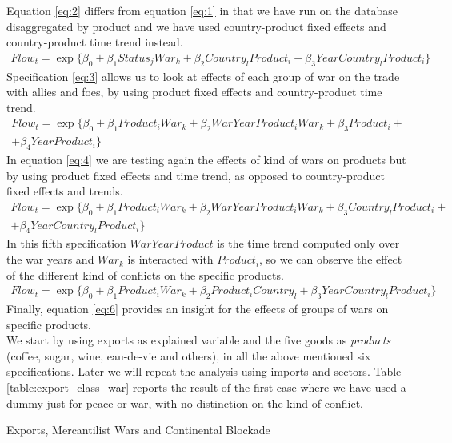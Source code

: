 \documentclass[12pt,a4paper,notitlepage,english]{article}
\begin{document}
Equation \ref{eq:2} differs from equation \ref{eq:1} in that we have run on the database disaggregated by product and we have used country-product fixed effects and country-product time trend instead.  
\begin{multline}\label{eq:3}
Flow_{t}=\exp\{\beta_0+\beta_1Status_jWar_k + \beta_2Country_lProduct_i+\beta_3YearCountry_lProduct_i\}
\end{multline}
Specification \ref{eq:3} allows us to look at effects of each group of war on the trade with allies and foes, by using product fixed effects and country-product time trend.
\begin{multline}\label{eq:4}
Flow_{t}=\exp\{\beta_0+\beta_1Product_iWar_k + \beta_2WarYearProduct_iWar_k+\beta_3Product_i +\\ +\beta_4YearProduct_i\}
\end{multline}
In equation \ref{eq:4} we are testing again the effects of kind of wars on products but by using product fixed effects and time trend, as opposed to country-product fixed effects and trends. 
\begin{multline}\label{eq:5}
Flow_{t}=\exp\{\beta_0+\beta_1Product_iWar_k + \beta_2WarYearProduct_iWar_k+\beta_3Country_lProduct_i +\\ +\beta_4YearCountry_lProduct_i\}
\end{multline}
In this fifth specification $WarYearProduct$ is the time trend computed only over the war years and $War_k$ is interacted with $Product_i$, so we can observe the effect of the different kind of conflicts on the specific products. 
\begin{multline}\label{eq:6}
Flow_{t}=\exp\{\beta_0+\beta_1Product_iWar_k + \beta_2Product_iCountry_l+\beta_3YearCountry_lProduct_i\}
\end{multline}
Finally, equation \ref{eq:6} provides an insight for the effects of groups of wars on specific products. \\
We start by using exports as explained variable and the five goods as \textit{products} (coffee, sugar, wine, eau-de-vie and others), in all the above mentioned six specifications. Later we will repeat the analysis using imports and sectors. 
Table \ref{table:export_class_war} reports the result of the first case where we have used a dummy just for peace or war, with no distinction on the kind of conflict.
\begin{table}
\begin{center}
\caption {Exports, Mercantilist Wars and Continental Blockade} 
\label{table:export_class_block}
\renewcommand{\arraystretch}{0.6}

\end{center}
\end{table}
\end{document}
